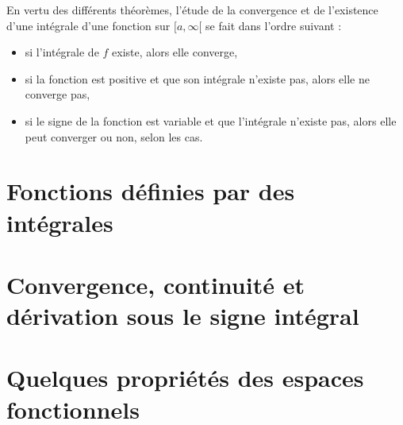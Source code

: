 En vertu des différents théorèmes, l'étude de la convergence et de l'existence d'une intégrale d'une fonction sur $[a,\infty[$ se fait dans l'ordre suivant :
\begin{itemize}
\item si l'intégrale de $f$ existe, alors elle converge,
\item si la fonction est positive et que son intégrale n'existe pas, alors elle ne converge pas,
\item si le signe de la fonction est variable et que l'intégrale n'existe pas, alors elle peut converger ou non, selon les cas.
\end{itemize}


					\section{Fonctions définies par des intégrales}



					\section{Convergence, continuité et dérivation sous le signe intégral}

					\section{Quelques propriétés des espaces fonctionnels}

